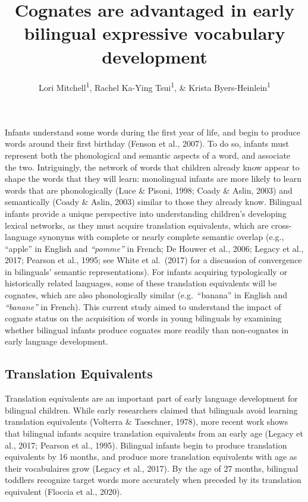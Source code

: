 \documentclass[
  english,
  ,man,floatsintext]{apa6}
\title{Cognates are advantaged in early bilingual expressive vocabulary development}
\author{Lori Mitchell\textsuperscript{1}, Rachel Ka-Ying Tsui\textsuperscript{1}, \& Krista Byers-Heinlein\textsuperscript{1}}
\date{}
\affiliation{\vspace{0.5cm}\textsuperscript{1} Concordia University}
\begin{document}
\maketitle

\captionsetup[table]{labelformat=empty}

Infants understand some words during the first year of life, and begin to produce words around their first birthday (Fenson et al., 2007). To do so, infants must represent both the phonological and semantic aspects of a word, and associate the two. Intriguingly, the network of words that children already know appear to shape the words that they will learn: monolingual infants are more likely to learn words that are phonologically (Luce \& Pisoni, 1998; Coady \& Aslin, 2003) and semantically (Coady \& Aslin, 2003) similar to those they already know. Bilingual infants provide a unique perspective into understanding children's developing lexical networks, as they must acquire translation equivalents, which are cross-language synonyms with complete or nearly complete semantic overlap (e.g., ``apple'' in English and \emph{``pomme''} in French; De Houwer et al., 2006; Legacy et al., 2017; Pearson et al., 1995; see White et al.~(2017) for a discussion of convergence in bilinguals' semantic representations). For infants acquiring typologically or historically related languages, some of these translation equivalents will be cognates, which are also phonologically similar (e.g.~``banana'' in English and \emph{``banane''} in French). This current study aimed to understand the impact of cognate status on the acquisition of words in young bilinguals by examining whether bilingual infants produce cognates more readily than non-cognates in early language development.

\hypertarget{translation-equivalents}{%
\subsection{Translation Equivalents}\label{translation-equivalents}}

Translation equivalents are an important part of early language development for bilingual children. While early researchers claimed that bilinguals avoid learning translation equivalents (Volterra \& Taeschner, 1978), more recent work shows that bilingual infants acquire translation equivalents from an early age (Legacy et al., 2017; Pearson et al., 1995). Bilingual infants begin to produce translation equivalents by 16 months, and produce more translation equivalents with age as their vocabulaires grow (Legacy et al., 2017). By the age of 27 months, bilingual toddlers recognize target words more accurately when preceded by its translation equivalent (Floccia et al., 2020).
\end{document}

